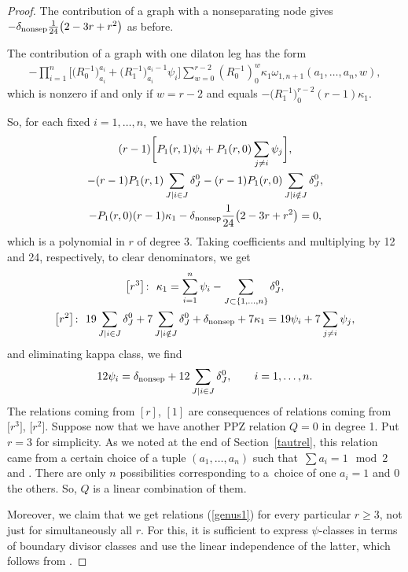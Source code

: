 \documentclass[pdftex]{sigma}
\numberwithin{equation}{section}
\begin{document}
\begin{proof}
The contribution of a graph with a nonseparating node
 gives $ -\delta_{\rm nonsep}\frac{1}{24}\big(2-3r+r^2\big)$ as before.

The contribution of a graph with one dilaton leg has the form
\begin{align*}
-\prod^{n}_{i=1}\big[\big(R^{-1}_{0}\big)^{a_i}_{a_i}+\big(R^{-1}_{1}\big)^{a_i-1}_{a_i}\psi_i\big]\sum^{r-2}_{w=0}(R^{-1}_{0})^{w}_{0}\kappa_1 \omega_{1,n+1}(a_1,\dots,a_n,w),
\end{align*}
which is nonzero if and only if $w = r-2$ and equals $-\big(R^{-1}_{1}\big)^{r-2}_{0}(r-1)\kappa_1$.

So, for each fixed $i = 1,\dots,n$, we have the relation
\begin{gather*}
(r-1)\bigg[P_1(r,1)\psi_i +P_1(r,0) \sum_{j\neq i}\psi_j\bigg],\\
-(r-1)P_1(r,1)\sum_{J| i \in J} \delta^{0}_{J} -(r-1)P_1(r,0)\sum_{J| i \notin J} \delta^{0}_{J},\\
-P_1(r,0)(r-1)\kappa_1 -\delta_{\rm nonsep}\dfrac{1}{24}\big(2-3r+r^2\big) = 0,
\end{gather*}
which is a polynomial in $r$ of degree $3$. Taking coefficients and multiplying by 12 and 24, respectively, to clear denominators, we get
\begin{gather*}
\big[r^3\big]\colon\ \kappa_1 = \sum^{n}_{i=1}\psi_i - \sum_{J\subset \{1,\dots,n\}}\delta^{0}_{J},\\
\big[r^2\big]\colon\ 19\sum_{J| i \in J}\delta^{0}_{J} + 7\sum_{J| i \notin J}\delta^{0}_{J} + \delta_{\rm nonsep} + 7\kappa_1 = 19\psi_i + 7\sum_{j\neq i}\psi_j,
\end{gather*}
and eliminating kappa class, we find
\begin{gather*}
12\psi_i = \delta_{\rm nonsep} + 12\sum_{J|i\in J} \delta^{0}_{J}, \qquad
 i=1,\dots,n.
\end{gather*}
The relations coming from $[r]$, $[1]$ are consequences of relations coming from $\big[r^3\big]$, $\big[r^2\big]$.
Suppose now that we have another PPZ relation $Q=0$ in degree 1. Put $r=3$ for simplicity. As we noted at the end of Section~\ref{tautrel}, this relation came from a certain choice of a tuple $(a_1,\dots, a_n)$ such that~${\sum a_i = 1 \mod 2}$ and . There are only $n$ possibilities corresponding to a~choice of one $a_i=1$ and 0 the others. So, $Q$ is a linear combination of them.

Moreover, we claim that we get relations (\ref{genus1}) for every particular $r\geq3$, not just for simultaneously all $r$. For this, it is sufficient to express $\psi$-classes in terms of boundary divisor classes and use the linear independence of the latter, which follows from \cite[Theorem 2.2]{Cor}.


\end{proof}
\end{document}
